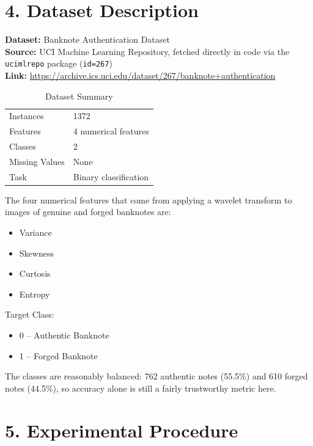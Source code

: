\documentclass[11pt]{article}
\begin{document}
\section*{4. Dataset Description}

\textbf{Dataset:} Banknote Authentication Dataset\\
\textbf{Source:} UCI Machine Learning Repository, fetched directly in code via the \texttt{ucimlrepo} package (\texttt{id=267})\\
\textbf{Link:} \url{https://archive.ics.uci.edu/dataset/267/banknote+authentication}

\begin{table}[H]
\centering
\caption{Dataset Summary}
\begin{tabular}{ll}
\toprule
Instances & 1372 \\
Features & 4 numerical features \\
Classes & 2 \\
Missing Values & None \\
Task & Binary classification \\
\bottomrule
\end{tabular}
\end{table}

The four numerical features that come from applying a wavelet transform to images of genuine and forged banknotes are:

\begin{itemize}
\item Variance
\item Skewness
\item Curtosis
\item Entropy
\end{itemize}

Target Class:

\begin{itemize}
\item 0 -- Authentic Banknote
\item 1 -- Forged Banknote
\end{itemize}

The classes are reasonably balanced: 762 authentic notes (55.5\%) and 610 forged notes (44.5\%), so accuracy alone is still a fairly trustworthy metric here.


\section*{5. Experimental Procedure}
\end{document}
